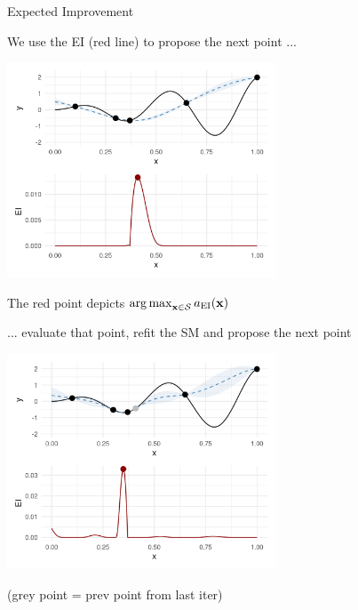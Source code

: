 \documentclass[11pt,compress,t,notes=noshow, xcolor=table]{beamer}
\begin{document}
\begin{vbframe}{Expected Improvement}

We use the EI (red line) to propose the next point ...

\begin{center}
  \includegraphics[width = 0.6\textwidth]{figure_man/bayesian_loop_1.png}
\end{center}

The red point depicts $\operatorname{arg\,max}_{\mathbf{x} \in \mathcal{S}} a_{\text{EI}}(\mathbf{x})$

\framebreak

... evaluate that point, refit the SM and propose the next point

\begin{center}
  \includegraphics[width = 0.6\textwidth]{figure_man/bayesian_loop_2.png}
\end{center}

(grey point = prev point from last iter)

\end{vbframe}
\end{document}
